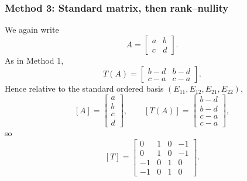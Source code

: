 \documentclass[12pt]{article}
\begin{document}
\subsubsection{Method 3: Standard matrix, then rank--nullity}
We again write
\[
A=\begin{bmatrix}a&b\\c&d\end{bmatrix}.
\]
As in Method 1,
\[
T(A)=
\begin{bmatrix}
b-d&b-d\\
c-a&c-a
\end{bmatrix}.
\]
Hence relative to the standard ordered basis \((E_{11},E_{12},E_{21},E_{22})\),
\[
[A]=\begin{bmatrix}a\\b\\c\\d\end{bmatrix},
\qquad
[T(A)]=\begin{bmatrix}b-d\\b-d\\c-a\\c-a\end{bmatrix},
\]
so
\[
[T]=
\begin{bmatrix}
0&1&0&-1\\
0&1&0&-1\\
-1&0&1&0\\
-1&0&1&0
\end{bmatrix}.
\]
\end{document}
